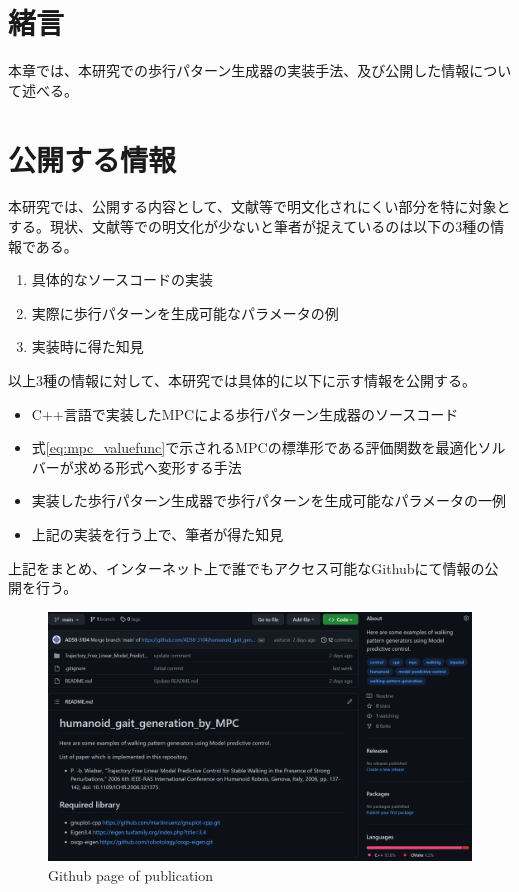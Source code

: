 \section{緒言}
本章では、本研究での歩行パターン生成器の実装手法、及び公開した情報について述べる。

\section{公開する情報}
本研究では、公開する内容として、文献等で明文化されにくい部分を特に対象とする。現状、文献等での明文化が少ないと筆者が捉えているのは以下の3種の情報である。
\begin{enumerate}
  \item 具体的なソースコードの実装
  \item 実際に歩行パターンを生成可能なパラメータの例
  \item 実装時に得た知見
\end{enumerate}

以上3種の情報に対して、本研究では具体的に以下に示す情報を公開する。

\begin{itemize}
  \item C++言語で実装したMPCによる歩行パターン生成器のソースコード
  \item 式\eqref{eq:mpc_valuefunc}で示されるMPCの標準形である評価関数を最適化ソルバーが求める形式へ変形する手法
  \item 実装した歩行パターン生成器で歩行パターンを生成可能なパラメータの一例
  \item 上記の実装を行う上で、筆者が得た知見
\end{itemize}

上記をまとめ、インターネット上で誰でもアクセス可能なGithub\cite{MYGITHUB}にて情報の公開を行う。

\begin{figure}[hbtp]
  \centering
 \includegraphics[keepaspectratio, scale=0.4]
      {images/github_example.png}
\caption{ Github page of publication}
 \label{Fig:github_example}
\end{figure}

